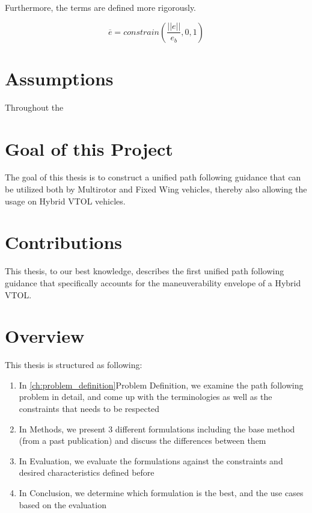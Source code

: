 Furthermore, the terms are defined more rigorously.

\begin{equation}
    \overline{e} = constrain(\frac{||e||}{e_b}, 0, 1)
\label{eq:normliazed_track_error_def}
\end{equation}

\section{Assumptions}
Throughout the

\section{Goal of this Project}
The goal of this thesis is to construct a unified path following guidance that can be utilized both by Multirotor and Fixed Wing vehicles, thereby also allowing the usage on Hybrid VTOL vehicles.

\section{Contributions}
This thesis, to our best knowledge, describes the first unified path following guidance that specifically accounts for the maneuverability envelope of a Hybrid VTOL.

\section{Overview}
This thesis is structured as following:

\begin{enumerate}
    \item In \ref{ch:problem_definition}{Problem Definition}, we examine the path following problem in detail, and come up with the terminologies as well as the constraints that needs to be respected
    \item In Methods, we present 3 different formulations including the base method (from a past publication) and discuss the differences between them
    \item In Evaluation, we evaluate the formulations against the constraints and desired characteristics defined before
    \item In Conclusion, we determine which formulation is the best, and the use cases based on the evaluation
\end{enumerate}